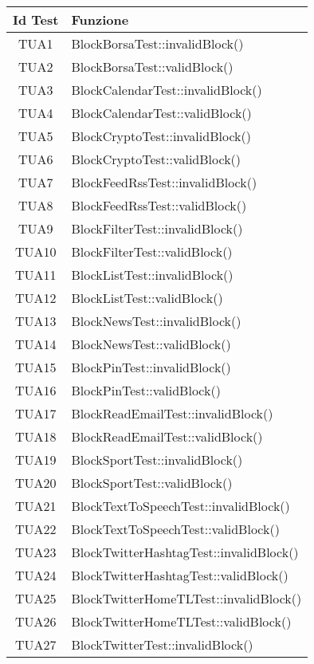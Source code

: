 \normalsize
\begin{longtable}{|c|m{28em}|}
	\hline 
	\textbf{Id Test} & \textbf{Funzione}\\
	\hline
	\endhead
	TUA1 & BlockBorsaTest::invalidBlock() \\ \hline
	TUA2 & BlockBorsaTest::validBlock() \\ \hline
	TUA3 & BlockCalendarTest::invalidBlock()\\ \hline
	TUA4 & BlockCalendarTest::validBlock() \\ \hline
	TUA5 & BlockCryptoTest::invalidBlock() \\ \hline
	TUA6 & BlockCryptoTest::validBlock() \\ \hline
	TUA7 & BlockFeedRssTest::invalidBlock()\\ \hline
	TUA8 & BlockFeedRssTest::validBlock() \\ \hline
	TUA9 & BlockFilterTest::invalidBlock()\\ \hline
	TUA10 & BlockFilterTest::validBlock()\\ \hline
	TUA11 & BlockListTest::invalidBlock() \\ \hline
	TUA12 & BlockListTest::validBlock() \\ \hline
	TUA13 & BlockNewsTest::invalidBlock()\\ \hline
	TUA14 & BlockNewsTest::validBlock() \\ \hline
	TUA15 & BlockPinTest::invalidBlock()\\ \hline
	TUA16 & BlockPinTest::validBlock()\\ \hline
	TUA17 & BlockReadEmailTest::invalidBlock()\\ \hline
	TUA18 & BlockReadEmailTest::validBlock()\\ \hline	
	TUA19 & BlockSportTest::invalidBlock()\\ \hline
	TUA20 & BlockSportTest::validBlock()\\ \hline
	TUA21 & BlockTextToSpeechTest::invalidBlock()\\ \hline
	TUA22 & BlockTextToSpeechTest::validBlock()\\ \hline
	TUA23 & BlockTwitterHashtagTest::invalidBlock()\\ \hline
	TUA24 & BlockTwitterHashtagTest::validBlock()\\ \hline
	TUA25 & BlockTwitterHomeTLTest::invalidBlock()\\ \hline
	TUA26 & BlockTwitterHomeTLTest::validBlock()\\ \hline
	TUA27 & BlockTwitterTest::invalidBlock()\\ \hline

\end{longtable}
